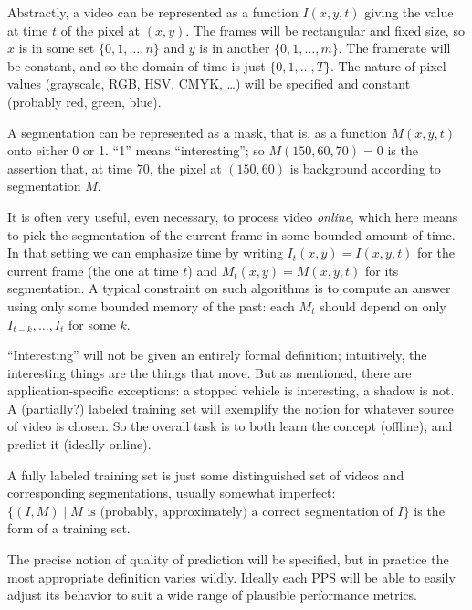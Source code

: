 Abstractly, a video can be represented as a function $I(x,y,t)$ giving
the value at time $t$ of the pixel at $(x,y)$.  The frames will be
rectangular and fixed 
size, so $x$ is in some set $\{0,1,\ldots,n\}$ and $y$ is in another
$\{0,1,\ldots,m\}$.  The framerate will be constant, and so the domain
of time is just $\{0,1,\ldots,T\}$.  The nature of pixel values
(grayscale, RGB, HSV, CMYK, \ldots) will be specified and constant
(probably red, green, blue).

A segmentation can be represented as a mask, that is, as a function
$M(x,y,t)$ onto either 0 or 1.  ``1'' means ``interesting''; so
$M(150,60,70)=0$ is the assertion that, at time $70$, the pixel at
$(150,60)$ is background according to segmentation $M$.

It is often very useful, even necessary, to process video
\emph{online}, which here means to pick the segmentation of the
current frame in some bounded amount of time.  In that setting we
can emphasize time by writing $I_t(x,y)=I(x,y,t)$
for the current frame (the one at time $t$) and $M_t(x,y)=M(x,y,t)$
for its segmentation.  A typical constraint on such algorithms is to
compute an answer using only some bounded memory of the past: each
$M_t$ should depend on only $I_{t-k},\ldots, I_t$ for some $k$.

``Interesting'' will not be given an entirely formal
definition; intuitively, the interesting things are the things that
move.  But as mentioned, there are application-specific exceptions: a
stopped vehicle is interesting, a shadow is not.
A (partially?) labeled training set will exemplify the notion for
whatever source of video is chosen.
So the overall task is to both learn the concept (offline), and
predict it (ideally online).

A fully labeled training set is just some distinguished set of videos and
corresponding segmentations, usually somewhat imperfect:
$\{(I,M) \mid \text{$M$ is (probably, approximately) a correct
  segmentation of $I$}\}$ is the form of a training set.

The precise notion of quality of prediction will be specified, but in
practice the most appropriate definition varies wildly.  Ideally each
PPS will be able to easily adjust its behavior to suit a wide range of
plausible performance metrics.






